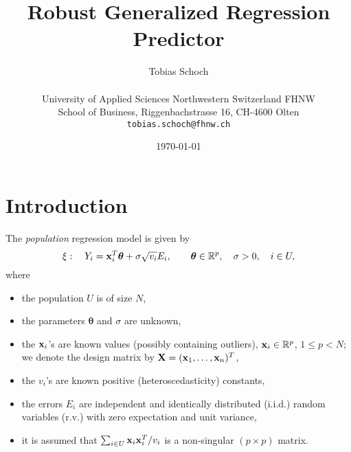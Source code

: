 \documentclass[a4paper,oneside,11pt,DIV=12]{scrartcl}
\theoremstyle{remark}
\newcommand{\R}{\mathbb{R}}
\begin{document}

\title{\Large Robust Generalized Regression Predictor}

\author{{\normalsize Tobias Schoch} \\
\begin{minipage}[t][][t]{\textwidth}
	\begin{center}
	\small{University of Applied Sciences Northwestern Switzerland FHNW} \\
	\small{School of Business, Riggenbachstrasse 16, CH-4600 Olten} \\
	\small{\texttt{tobias.schoch{@}fhnw.ch}}
	\end{center}
\end{minipage}}

\date{{\small \today}}
\maketitle

\renewenvironment{abstract}{%
\begin{center}\begin{minipage}{0.9\textwidth}
\rule{\textwidth}{0.4pt}
{\sffamily\bfseries\footnotesize Abstract.}\small}
{\par\noindent\rule{\textwidth}{0.4pt}\end{minipage}\end{center}}

\section{Introduction}\label{ch:introduction}

The   \emph{population} regression model is given by
\begin{equation}\label{eq:reg_model}
    \xi: \quad Y_i = \bold x_i^T \boldsymbol{\theta} + \sigma \sqrt{v_i}E_i,
    \qquad \boldsymbol{\theta} \in \R^p, \quad \sigma > 0, \quad i \in U,
\end{equation}
\noindent where
\begin{itemize}
    \item the population $U$ is of size $N$,
    \item the parameters $\boldsymbol{\theta}$ and $\sigma$ are unknown,
    \item the $\bold x_i$'s are known values (possibly containing outliers),
        $\bold x_i \in \R^p$, $1 \leq p < N$; we denote the design matrix by
        $\bold X = (\bold x_1, \ldots, \bold x_n)^T$,
    \item the $v_i$'s are known positive (heteroscedasticity) constants,
    \item the errors $E_i$ are independent and identically distributed (i.i.d.)
        random variables (r.v.) with zero expectation and unit variance,
    \item it is assumed that $\sum_{i \in U} \bold x_i \bold x_i^T / v_i$ is a
        non-singular $(p \times p)$ matrix.
\end{itemize}
\end{document}
